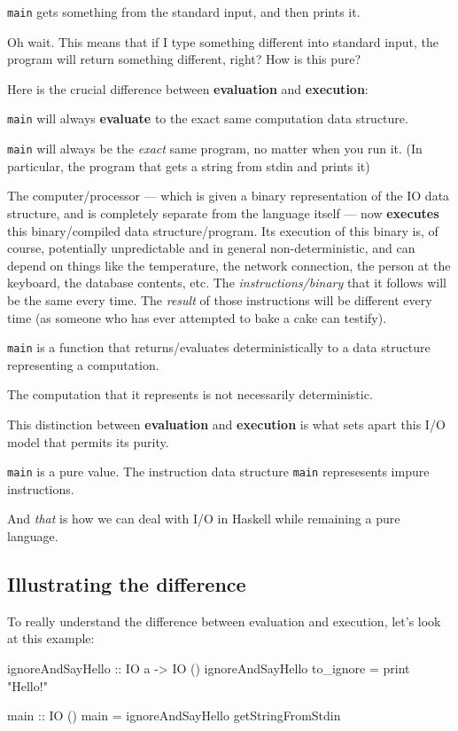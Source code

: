 \documentclass[]{article}
\newenvironment{Shaded}{}{}
\newcommand{\DataTypeTok}[1]{\textcolor[rgb]{0.56,0.13,0.00}{{#1}}}
\newcommand{\StringTok}[1]{\textcolor[rgb]{0.25,0.44,0.63}{{#1}}}
\newcommand{\OtherTok}[1]{\textcolor[rgb]{0.00,0.44,0.13}{{#1}}}
\newcommand{\FunctionTok}[1]{\textcolor[rgb]{0.02,0.16,0.49}{{#1}}}
\newcommand{\NormalTok}[1]{{#1}}
\begin{document}
\texttt{main} gets something from the standard input, and then prints
it.

Oh wait. This means that if I type something different into standard
input, the program will return something different, right? How is this
pure?

Here is the crucial difference between \textbf{evaluation} and
\textbf{execution}:

\texttt{main} will always \textbf{evaluate} to the exact same
computation data structure.

\texttt{main} will always be the \emph{exact} same program, no matter
when you run it. (In particular, the program that gets a string from
stdin and prints it)

The computer/processor --- which is given a binary representation of the
IO data structure, and is completely separate from the language itself
--- now \textbf{executes} this binary/compiled data structure/program.
Its execution of this binary is, of course, potentially unpredictable
and in general non-deterministic, and can depend on things like the
temperature, the network connection, the person at the keyboard, the
database contents, etc. The \emph{instructions/binary} that it follows
will be the same every time. The \emph{result} of those instructions
will be different every time (as someone who has ever attempted to bake
a cake can testify).

\texttt{main} is a function that returns/evaluates deterministically to
a data structure representing a computation.

The computation that it represents is not necessarily deterministic.

This distinction between \textbf{evaluation} and \textbf{execution} is
what sets apart this I/O model that permits its purity.

\texttt{main} is a pure value. The instruction data structure
\texttt{main} represesents impure instructions.

And \emph{that} is how we can deal with I/O in Haskell while remaining a
pure language.

\subsection{Illustrating the
difference}\label{illustrating-the-difference}

To really understand the difference between evaluation and execution,
let's look at this example:

\begin{Shaded}
\begin{Highlighting}[]
\OtherTok{ignoreAndSayHello ::} \DataTypeTok{IO} \NormalTok{a }\OtherTok{->} \DataTypeTok{IO} \NormalTok{()}
\NormalTok{ignoreAndSayHello to_ignore }\FunctionTok{=} \NormalTok{print }\StringTok{"Hello!"}

\OtherTok{main ::} \DataTypeTok{IO} \NormalTok{()}
\NormalTok{main }\FunctionTok{=} \NormalTok{ignoreAndSayHello getStringFromStdin}
\end{Highlighting}
\end{Shaded}
\end{document}
